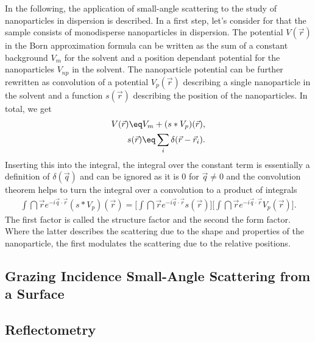 \documentclass[\main/dresen_thesis.tex]{subfiles}
\begin{document}
In the following, the application of small-angle scattering to the study of nanoparticles in dispersion is described. 
In a first step, let's consider for that the sample consists of monodisperse nanoparticles in dispersion. 
The potential $V(\vec{r})$ in the Born approximation formula  can be written as the sum of a constant background $V_m$ for the solvent and a position dependant potential for the nanoparticles $V_{np}$ in the solvent. The nanoparticle potential can be further rewritten as convolution of a potential $V_{p}(\vec{r})$ describing a single nanoparticle in the solvent and a function $s(\vec{r})$ describing the position of the nanoparticles. In total, we get
\begin{align}
  V(\vec{r}) \eq V_{m} + (s * V_{p})(\vec{r}),\\
  s(\vec{r}) \eq \sum_i \delta(\vec{r} - \vec{r}_i).
\end{align}
Inserting this into the integral, the integral over the constant term is essentially a definition of $\delta (\vec{q})$ and can be ignored as it is 0 for $\vec{q} \neq 0$ and the convolution theorem helps to turn the integral over a convolution to a product of integrals
\begin{align}
  \int \dint \vec{r} e^{-i\vec{q} \cdot \vec{r}} (s * V_{p})(\vec{r}) = \bigg[\int \dint \vec{r} e^{-i\vec{q} \cdot \vec{r}} s(\vec{r})\bigg] \bigg[\int \dint \vec{r} e^{-i\vec{q} \cdot \vec{r}} V_{p}(\vec{r}) \bigg].
\end{align}
The first factor is called the structure factor and the second the form factor. Where the latter describes the scattering due to the shape and properties of the nanoparticle, the first modulates the scattering due to the relative positions. 
\subsection{Grazing Incidence Small-Angle Scattering from a Surface}\label{sec:theoreticalBackground:scattering:GISAS}
\subsection{Reflectometry}\label{sec:theoreticalBackground:scattering:reflectometry}
\end{document}

